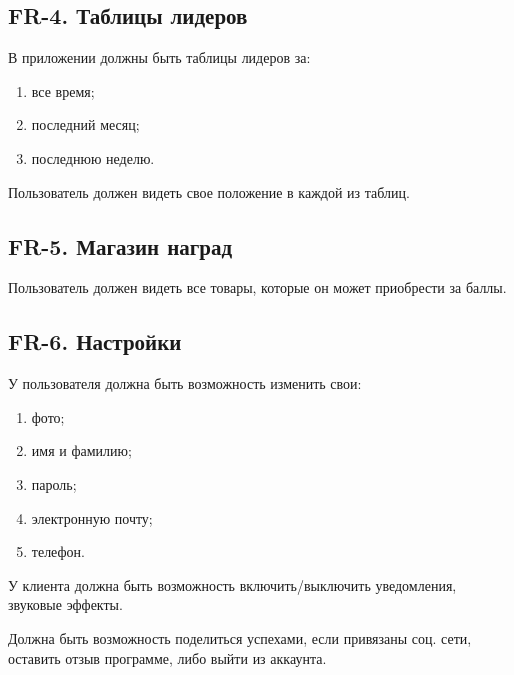 	\subsection*{FR-4. Таблицы лидеров}
	
			\hspace{10mm} В приложении должны быть таблицы лидеров за:
			\begin{enumerate}
				\item все время;
				\item последний месяц;
				\item последнюю неделю.
			\end{enumerate}
		
		\hspace{10mm} Пользователь должен видеть свое положение в каждой из таблиц.
		
	\subsection*{FR-5. Магазин наград}
	
		\hspace{10mm} Пользователь должен видеть все товары, которые он может приобрести за баллы.
		
	\subsection*{FR-6. Настройки}	
	
		\hspace{10mm} У пользователя должна быть возможность изменить свои:
		\begin{enumerate}
			\item фото;
			\item имя и фамилию;
			\item пароль;
			\item электронную почту;
			\item телефон.
		\end{enumerate}
	
		\hspace{10mm} У клиента должна быть возможность включить/выключить уведомления, звуковые эффекты.
		
		\hspace{10mm} Должна быть возможность поделиться успехами, если привязаны соц. сети, оставить отзыв программе, либо выйти из аккаунта.